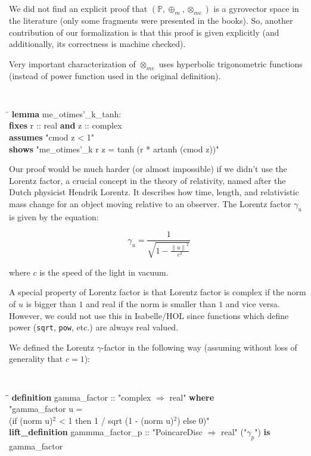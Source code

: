\documentclass[a4paper]{article}
\newcommand{\tab}{\hspace{5mm}}
\theoremstyle{definition}
\newcommand{\norm}[1]{\left\lVert#1\right\rVert}
\begin{document}
We did not find an explicit proof that
$(\mathbb{P}, \oplus_m, \otimes_{me})$ is a gyrovector space in the
literature (only some fragments were presented in the
books\cite{ungar-analytic}). So, another contribution of our
formalization is that this proof is given explicitly (and
additionally, its correctness is machine checked).

Very important characterization of $\otimes_{me}$ uses hyperbolic
trigonometric functions (instead of power function used in the
original definition).

{\tt
\begin{small}
\begin{tabbing}
\hspace{5mm}\=\kill
{\bf lemma} me\_otimes'\_k\_tanh:\\
\>  {\bf fixes} r :: real {\bf and} z :: complex\\
\>  {\bf assumes} "cmod z < 1"\\
\>  {\bf shows} "me\_otimes'\_k r z = tanh (r * artanh (cmod z))"
\end{tabbing}
\end{small}
}


Our proof would be much harder (or almost impossible) if we didn't use
the Lorentz factor, a crucial concept in the theory of relativity,
named after the Dutch physicist Hendrik Lorentz. It describes how
time, length, and relativistic mass change for an object moving
relative to an observer. The Lorentz factor $\gamma_u$ is given by the
equation:

$$\gamma_u = \frac{1}{\sqrt{1-\frac{\norm{u}^2}{c^2}}}$$

\noindent where $c$ is the speed of the light in vacuum.

A special property of Lorentz factor is that Lorentz factor is complex
if the norm of $u$ is bigger than $1$ and real if the norm is smaller
than $1$ and vice versa. However, we could not use this in
Isabelle/HOL since functions which define power (\texttt{sqrt},
\texttt{pow}, etc.)  are always real valued.

We defined the Lorentz $\gamma$-factor in the following way (assuming
without loss of generality that $c=1$):


{\tt
\begin{small}
\begin{tabbing}
\tab\=\tab\=\kill
{\bf definition} gamma\_factor :: "complex $\Rightarrow$ real" {\bf where}\\
\> "gamma\_factor u = \\
\>\> (if (norm u)$^2$ < 1 then  1 / sqrt (1 - (norm u)$^2$) else 0)"\\
{\bf lift\_definition} gammma\_factor\_p :: "PoincareDisc $\Rightarrow$ real" ("$\gamma_p$") {\bf is}\\
\> gamma\_factor
\end{tabbing}
\end{small}
\tt}
\end{document}
